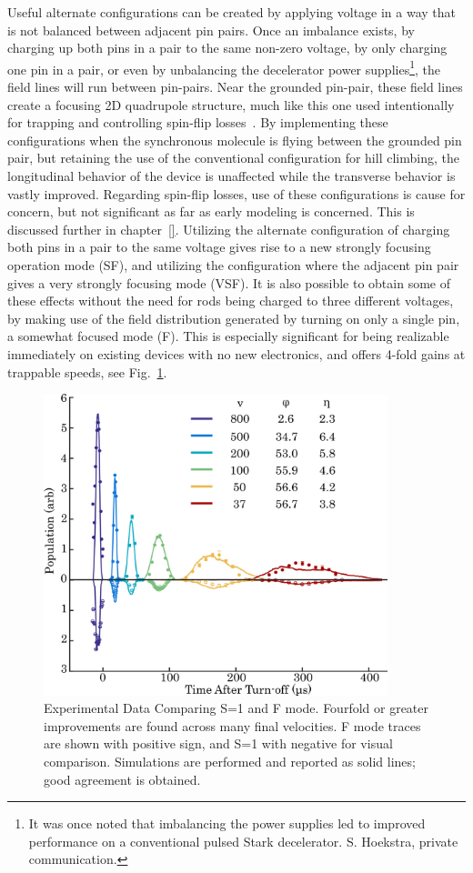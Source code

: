 Useful alternate configurations can be created by applying voltage in a way that is not balanced between adjacent pin pairs. 
Once an imbalance exists, by charging up both pins in a pair to the same non-zero voltage, by only charging one pin in a pair, or even by unbalancing the decelerator power supplies\footnote{It was once noted that imbalancing the power supplies led to improved performance on a conventional pulsed Stark decelerator. S. Hoekstra, private communication.}, the field lines will run between pin-pairs. 
Near the grounded pin-pair, these field lines create a focusing 2D quadrupole structure, much like this one used intentionally for trapping and controlling spin-flip losses~\cite{Reens2017}. 
By implementing these configurations when the synchronous molecule is flying between the grounded pin pair, but retaining the use of the conventional configuration for hill climbing, the longitudinal behavior of the device is unaffected while the transverse behavior is vastly improved.
Regarding spin-flip losses, use of these configurations is cause for concern, but not significant as far as early modeling is concerned. This is discussed further in chapter~\ref{}.
Utilizing the alternate configuration of charging both pins in a pair to the same voltage gives rise to a new strongly focusing operation mode (SF), and utilizing the configuration where the adjacent pin pair gives a very strongly focusing mode (VSF). 
It is also possible to obtain some of these effects without the need for rods being charged to three different voltages, by making use of the field distribution generated by turning on only a single pin, a somewhat focused mode (F).
This is especially significant for being realizable immediately on existing devices with no new electronics, and offers 4-fold gains at trappable speeds, see Fig.~\ref{fig:speedvary}. 

\begin{figure}[t!]
\centering
\includegraphics[width=10cm]{Slowing/speedvary.png}%
\caption[S=1 and F Mode Experimental Comparison]{\label{fig:speedvary}
Experimental Data Comparing S=1 and F mode. Fourfold or greater improvements are found across many final velocities. F mode traces are shown with positive sign, and S=1 with negative for visual comparison. Simulations are performed and reported as solid lines; good agreement is obtained.
}
\end{figure}


